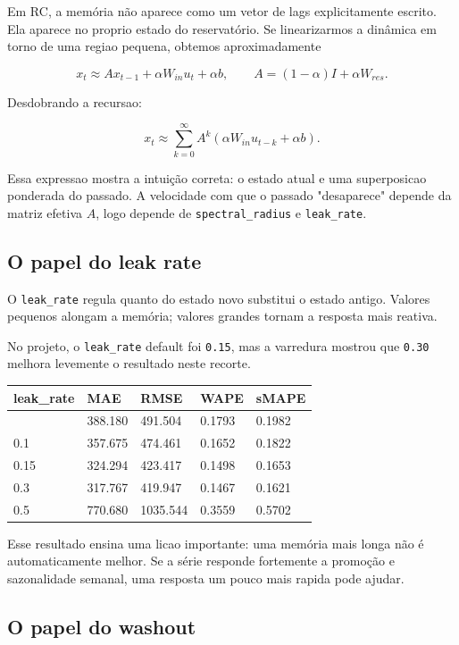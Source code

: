 \documentclass[12pt]{article}
\begin{document}
Em RC, a memória não aparece como um vetor de lags explicitamente escrito. Ela aparece no proprio estado do reservatório. Se linearizarmos a dinâmica em torno de uma regiao pequena, obtemos aproximadamente

\[
x_t \approx A x_{t-1} + \alpha W_{in} u_t + \alpha b,
\qquad
A = (1 - \alpha) I + \alpha W_{res}.
\]

Desdobrando a recursao:

\[
x_t \approx \sum_{k=0}^\infty A^k (\alpha W_{in} u_{t-k} + \alpha b).
\]

Essa expressao mostra a intuição correta: o estado atual e uma superposicao ponderada do passado. A velocidade com que o passado "desaparece" depende da matriz efetiva \(A\), logo depende de \texttt{spectral\_radius} e \texttt{leak\_rate}.

\subsection{O papel do leak rate}\label{21-o-papel-do-leak-rate}

O \texttt{leak\_rate} regula quanto do estado novo substitui o estado antigo. Valores pequenos alongam a memória; valores grandes tornam a resposta mais reativa.

No projeto, o \texttt{leak\_rate} default foi \texttt{0.15}, mas a varredura mostrou que \texttt{0.30} melhora levemente o resultado neste recorte.

\begin{longtable}[]{@{}lllll@{}}
\toprule\noalign{}
leak\_rate & MAE & RMSE & WAPE & sMAPE \\
\midrule\noalign{}
\endhead
\bottomrule\noalign{}
\endlastfoot
0.05 & 388.180 & 491.504 & 0.1793 & 0.1982 \\
0.1 & 357.675 & 474.461 & 0.1652 & 0.1822 \\
0.15 & 324.294 & 423.417 & 0.1498 & 0.1653 \\
0.3 & 317.767 & 419.947 & 0.1467 & 0.1621 \\
0.5 & 770.680 & 1035.544 & 0.3559 & 0.5702 \\
\end{longtable}

Esse resultado ensina uma licao importante: uma memória mais longa não é automaticamente melhor. Se a série responde fortemente a promoção e sazonalidade semanal, uma resposta um pouco mais rapida pode ajudar.

\subsection{O papel do washout}\label{22-o-papel-do-washout}
\end{document}
